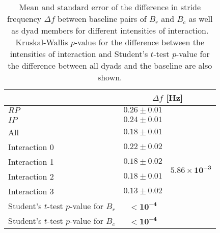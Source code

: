 \begin{table}
\centering
\caption{Mean and standard error of the difference in stride frequency $\Delta f$ between baseline pairs of $B_r$ and $B_c$ as well as dyad members for different intensities of interaction. Kruskal-Wallis $p$-value for the difference between the intensities of interaction and Student's $t$-test $p$-value for the difference between all dyads and the baseline are also shown.}
\label{tab:delta_f}
\begin{tabular}{lcc}
\toprule
& \multicolumn{2}{c}{$\Delta f$ [Hz]}  \\
\midrule
$RP$ &$0.26 \pm 0.01$ & \\
$IP$ &$0.24 \pm 0.01$ & \\
\midrule
All & $0.18 \pm 0.01$ & \\
\midrule
Interaction 0 &$0.22 \pm 0.02$  & \multirow{4}{*}{$\mathbf{5.86 \times 10^{-3}}$} \\
Interaction 1 &$0.18 \pm 0.02$ & \\
Interaction 2 &$0.18 \pm 0.01$ & \\
Interaction 3 &$0.13 \pm 0.02$ & \\
\midrule
Student's $t$-test $p$-value for $B_r$ & $\mathbf{< 10^{-4}}$ \\Student's $t$-test $p$-value for $B_c$ & $\mathbf{< 10^{-4}}$ \\\bottomrule
\end{tabular}
\end{table}
